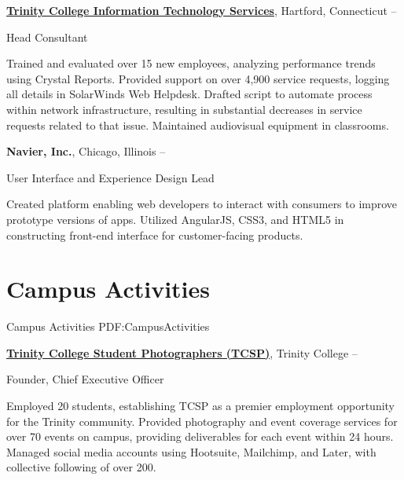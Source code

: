 \documentclass[letterpaper,10pt,oneside]{article}
\begin{document}
\begin{body}
\BigGapNoBreak
\href{http://www.trincoll.edu}
{\textbf{Trinity College Information Technology Services}},
Hartford, Connecticut
\hfill
{} --

\GapNoBreak
\BulletItem
Head Consultant
\begin{detail}
\SubBulletItem
Trained and evaluated over 15 new employees, analyzing performance trends using Crystal Reports.
\SubBulletItem
Provided support on over 4,900 service requests, logging all details in SolarWinds Web Helpdesk.
\SubBulletItem
Drafted script to automate process within network infrastructure, resulting in substantial decreases in service requests related to that issue.
\SubBulletItem
Maintained audiovisual equipment in classrooms.
\end{detail}

\BigGapNoBreak
{\textbf{Navier, Inc.}},
Chicago, Illinois
\hfill
{} --

\GapNoBreak
\BulletItem
User Interface and Experience Design Lead
\begin{detail}
\SubBulletItem
Created platform enabling web developers to interact with consumers to improve prototype versions of apps.
\SubBulletItem
Utilized AngularJS, CSS3, and HTML5 in constructing front-end interface for customer-facing products.
\end{detail}


\noindent\hrulefill
\section
{Campus Activities}
{Campus Activities}
{PDF:CampusActivities}

\href{http://commons.trincoll.edu/tcsp}
{\textbf{Trinity College Student Photographers (TCSP)}},
Trinity College
\hfill
{} --

\GapNoBreak
\BulletItem
Founder, Chief Executive Officer
\begin{detail}
\SubBulletItem
Employed 20 students, establishing TCSP as a premier employment opportunity for the Trinity community.
\SubBulletItem
Provided photography and event coverage services for over 70 events on campus, providing deliverables for each event within 24 hours.
\SubBulletItem
Managed social media accounts using Hootsuite, Mailchimp, and Later, with collective following of over 200.
\end{detail}


\end{body}
\end{document}
